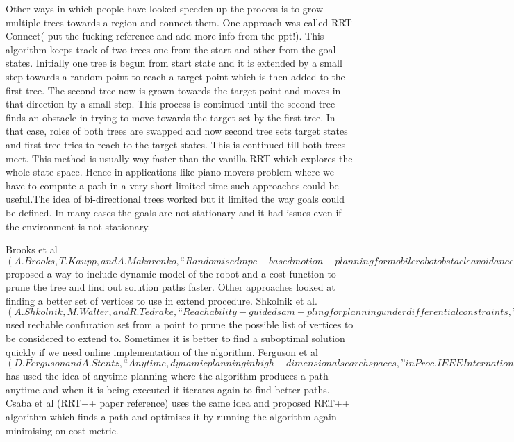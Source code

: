 \documentclass[MTech]{iitmdiss}
\begin{document}
Other ways in which people have looked speeden up the process is to grow multiple trees towards a region and connect them. One approach was called RRT-Connect( put the fucking reference and add more info from the ppt!). This algorithm keeps track of two trees one from the start and other from the goal states. Initially one tree is begun from start state and it is extended by a small step towards a random point to reach a target point which is then added to the first tree. The second tree now is grown towards the target point and moves in that direction by a small step. This process is continued until the second tree finds an obstacle in trying to move towards the target set by the first tree. In that case, roles of both trees are swapped and now second tree sets target states and first tree tries to reach to the target states. This is continued till both trees meet. This method is usually way faster than the vanilla RRT which explores the whole state space. Hence in applications like piano movers problem where we have to compute a path in a very short limited time such approaches could be useful.The idea of bi-directional trees worked but it limited the way goals could be defined. In many cases the goals are not stationary and it had issues even if the environment is not stationary. 
 
Brooks et al $(A. Brooks, T. Kaupp, and A. Makarenko, “Randomised mpc-based
motion-planning for mobile robot obstacle avoidance,” in Robotics and Automation, 2009. ICRA ’09. IEEE International Conference on, May 2009, pp. 3962–3967.)$ proposed a way to include dynamic model of the robot and a cost function to prune the tree and find out solution paths faster. Other approaches looked at finding a better set of vertices to use in extend procedure. Shkolnik et al.$ (A. Shkolnik, M. Walter, and R. Tedrake, “Reachability-guided sam- pling for planning under differential constraints,” in Robotics and Automation, 2009. ICRA ’09. IEEE International Conference on, May 2009, pp. 2859–2865.)$ used rechable confuration set from a point to prune the possible list of vertices to be considered to extend to. Sometimes it is better to find a suboptimal solution quickly if we need online implementation of the algorithm. Ferguson et al $(D. Ferguson and A. Stentz, “Anytime, dynamic planning in high- dimensional search spaces,” in Proc. IEEE International Conference on Robotics and Automation, 2007, pp. 1310–1315.) $has used the idea of anytime planning where the algorithm produces a path anytime and when it is being executed it iterates again to find better paths. Csaba et al (RRT++ paper reference) uses the same idea and proposed RRT++ algorithm which finds a path and optimises it by running the algorithm again minimising on cost metric. 
\end{document}
